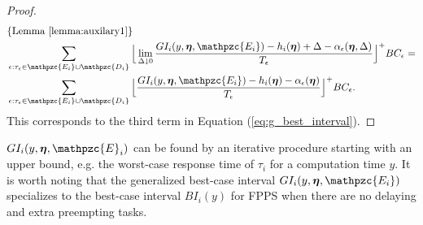 \begin{proof}
\begin{align*}
	& \{ \text{Lemma \ref{lemma:auxilary1}} \} \\ 
	& \sum\limits_{\epsilon:\tau_{\epsilon} \in \mathpzc{E_i} \cup \mathpzc{D_i}} \Big\lfloor \lim \limits_{\Delta \downarrow 0}  \dfrac{GI_i(y, \vec{\eta},  \mathpzc{E_i})-h_i(\vec{\eta})+\Delta-\alpha_\epsilon(\vec{\eta},\Delta)}{T_\epsilon}\Big\rfloor^+  BC_\epsilon
	= \\
	& \sum\limits_{\epsilon:\tau_{\epsilon} \in \mathpzc{E_i} \cup \mathpzc{D_i}} \Big\lfloor  \dfrac{GI_i(y, \vec{\eta},  \mathpzc{E_i})-h_i(\vec{\eta})-\alpha_\epsilon(\vec{\eta})}{T_\epsilon}\Big\rfloor^+  BC_\epsilon.
	\end{align*}
	This corresponds to the third term in Equation (\ref{eq:g_best_interval}).
\end{proof}


$GI_i(y,\vec{\eta},\mathpzc{E}_i)$ can be found by an iterative procedure starting with an upper bound, e.g. the worst-case response time of $\tau_i$ for a computation time $y$. It is worth noting that the generalized best-case interval $GI_i(y, \vec{\eta},\mathpzc{E_i})$ specializes to the best-case interval $BI_i(y)$ for FPPS when there are no delaying and extra preempting tasks. 
\fi

